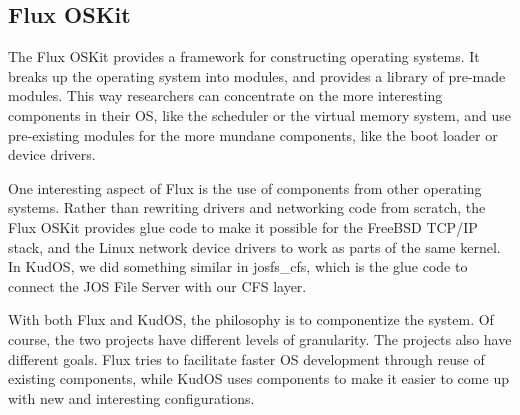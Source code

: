 \subsection{Flux OSKit}
\label{sec:related:flux}

The Flux OSKit \cite{ford97oskit} provides a framework for constructing
operating systems. It breaks up the operating system into modules, and provides
a library of pre-made modules. This way researchers can concentrate on the more
interesting components in their OS, like the scheduler or the virtual memory
system, and use pre-existing modules for the more mundane components, like the
boot loader or device drivers.

One interesting aspect of Flux is the use of components from other operating
systems. Rather than rewriting drivers and networking code from scratch, the
Flux OSKit provides glue code to make it possible for the FreeBSD TCP/IP stack,
and the Linux network device drivers to work as parts of the same kernel. In
KudOS, we did something similar in josfs\_cfs, which is the glue code to connect
the JOS File Server with our CFS layer.

With both Flux and KudOS, the philosophy is to componentize the system. Of
course, the two projects have different levels of granularity. The projects also
have different goals. Flux tries to facilitate faster OS development through
reuse of existing components, while KudOS uses components to make it easier to
come up with new and interesting configurations.
